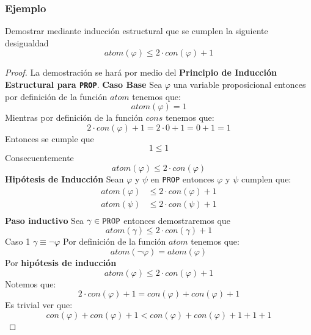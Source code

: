 \documentclass[a4paper]{article}
\begin{document}
\subsubsection{Ejemplo}
\noindent
Demostrar mediante inducción estructural que se cumplen la siguiente desigualdad
\[
    atom\left(\varphi\right)  \leq 2 \cdot con\left(\varphi\right) + 1
\]
\begin{proof}
    La demostración se hará por medio del \textbf{Principio de Inducción Estructural para \texttt{PROP}}.
    \newline
    \textbf{Caso Base}
    \newline
    Sea \(\varphi\) una variable proposicional entonces por definición de la función \(atom\) tenemos que:
    \[
        atom\left(\varphi\right) = 1
    \]
    Mientras por definición de la función \(cons\) tenemos que:
    \[
        2 \cdot con\left(\varphi\right) + 1 = 2 \cdot 0 + 1 = 0 + 1 = 1
    \]
    Entonces se cumple que
    \[
        1 \leq 1  
    \]
    Consecuentemente
    \[
        atom\left(\varphi\right) \leq  2 \cdot con\left(\varphi\right) 
    \]
    \textbf{Hipótesis de Inducción}
    \newline 
    Sean \(\varphi\) y \(\psi\) en \texttt{PROP} entonces \(\varphi\) y \(\psi\) cumplen que:
    \begin{align*}
        atom\left(\varphi\right)  &\leq 2 \cdot con\left(\varphi\right) + 1 \\
        atom\left(\psi\right)  &\leq 2 \cdot con\left(\psi\right) + 1 \\
    \end{align*}
    \textbf{Paso inductivo}
    \newline 
    Sea \(\gamma \in \text{\texttt{PROP}}\) entonces demostraremos que 
    \[
        atom\left(\gamma\right)  \leq 2 \cdot con\left(\gamma\right) + 1  
    \]
    Caso 1
    \newline 
    \(\gamma \equiv \neg \varphi\)
    \newline 
    Por definición de la función \(atom\) tenemos que:
    \[
        atom\left(\neg \varphi\right) = atom\left(\varphi\right)
    \]
    Por \textbf{hipótesis de inducción}
    \[
        atom\left(\varphi\right) \leq 2 \cdot con\left(\varphi\right) + 1
    \]
    Notemos que:
    \[
        2 \cdot con\left(\varphi\right) + 1 = con\left(\varphi\right) + con\left(\varphi\right) + 1
    \]
    Es trivial ver que:
    \[
        con\left(\varphi\right) + con\left(\varphi\right) + 1 < con\left(\varphi\right) +  con\left(\varphi\right) + 1 + 1 + 1
    \]

\end{proof}
\end{document}
